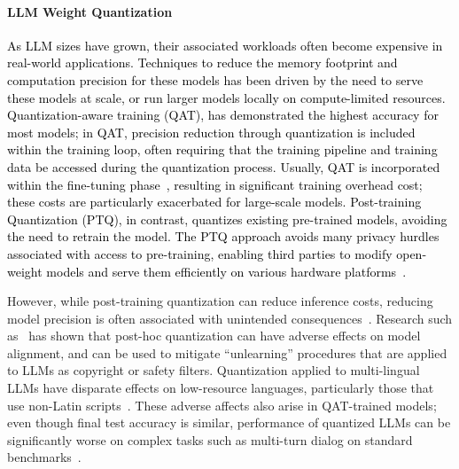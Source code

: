 \paragraph{LLM Weight Quantization} 
\textcolor{black}{As LLM sizes have grown, their associated workloads often become expensive in real-world applications. Techniques to reduce the memory footprint and computation precision for these models has been driven by the need to serve these models at scale, or run larger models locally on compute-limited resources. Quantization-aware training (QAT), has demonstrated the highest accuracy for most models; in QAT, precision reduction through quantization is included within the training loop, often requiring that the training pipeline and training data be accessed during the quantization process. Usually, QAT is incorporated within the fine-tuning phase~\cite{yao2022zeroquant}, resulting in significant training overhead cost; these costs are particularly exacerbated for large-scale models. Post-training Quantization (PTQ), in contrast, quantizes existing pre-trained models, avoiding the need to retrain the model. The PTQ approach avoids many privacy hurdles associated with access to pre-training, enabling third parties to modify open-weight models and serve them efficiently on various hardware platforms~\cite{lie2023cerebras,frantar2022gptq, ashkboos2024quarot}.}


However, while post-training quantization can reduce inference costs, reducing model precision is often associated with unintended consequences~\cite{sambanova2023reducedprecision, cerebras2024llama3}. Research such as~\cite{zhang2024does} has shown that post-hoc quantization can have adverse effects on model alignment, and can be used to mitigate ``unlearning'' procedures that are applied to LLMs as copyright or safety filters. Quantization applied to multi-lingual LLMs have disparate effects on low-resource languages, particularly those that use non-Latin scripts~\cite{marchisio2024does}. These adverse affects also arise in QAT-trained models; even though final test accuracy is similar, performance of quantized LLMs can be significantly worse on complex tasks such as multi-turn dialog on standard benchmarks~\cite{dutta2024accuracy}.   

